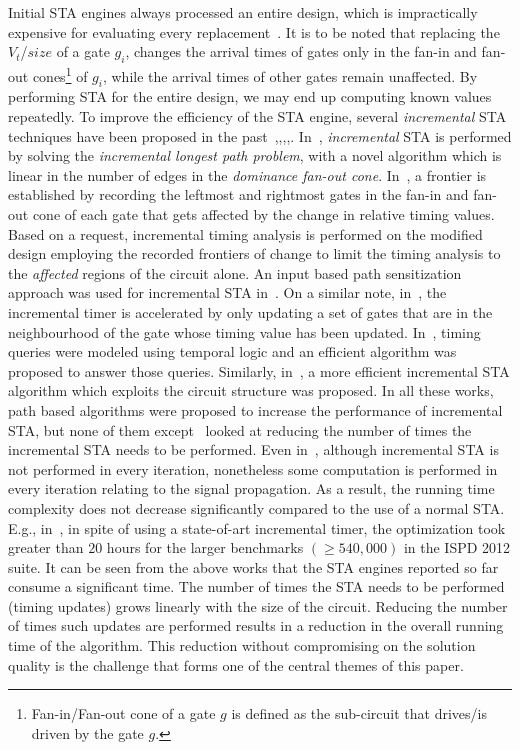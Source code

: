 Initial STA engines always processed an entire design, which is impractically expensive for evaluating every 
        replacement~\cite{papa:10}. It is to be noted that replacing the $V_t$/$size$ of a gate $g_i$, changes the arrival times of gates only in the fan-in and fan-out cones\footnote{Fan-in/Fan-out cone of a gate $g$ is defined as the sub-circuit that drives/is driven by the gate $g$\cite{abramovci}.} of $g_i$, while the arrival times of other gates remain unaffected. By performing STA for the entire design, we may end up computing known values repeatedly. 
        To improve the efficiency of the STA engine, several {\em incremental} STA techniques have been proposed in the past~\cite{lee:95},\cite{abato:96},\cite{sapatnekar:96},\cite{mondal:04},\cite{das:06}. In~\cite{lee:95}, {\em incremental} STA is performed by solving the {\em incremental longest path problem}, with a novel algorithm which is linear in the number of edges in the {\em dominance fan-out cone}. In~\cite{abato:96}, a frontier is established by recording the leftmost and rightmost gates in the fan-in and fan-out cone of each gate that gets affected by the change in relative timing values.
Based on a request, incremental timing analysis is performed on the modified design
employing the recorded frontiers of change to limit the timing analysis to 
the {\em affected} regions of the circuit alone. An input based path sensitization approach 
was used for incremental STA in~\cite{sapatnekar:96}.
On a similar note, in~\cite{coudert:97}, the incremental timer is accelerated by only updating a 
set of gates that are in the neighbourhood of the gate whose timing value has been updated. 
In~\cite{mondal:04}, timing queries were modeled using temporal logic and an efficient 
algorithm was proposed to answer those queries. Similarly, in~\cite{das:06}, a more 
efficient incremental STA algorithm which exploits the circuit structure was proposed. 
In all these works, path based algorithms were proposed to 
increase the performance of incremental STA, but none of them except~\cite{abato:96} looked 
at reducing the number of times the incremental STA needs to be performed. 
Even in~\cite{abato:96}, although incremental STA is not performed in every iteration, 
nonetheless some computation is performed in every iteration relating to the signal propagation. 
As a result, the running time complexity does not decrease significantly compared to the use of a normal STA. 
E.g., in~\cite{hu:12}, in spite of using a state-of-art incremental timer, the optimization 
        took greater than $20$ hours for the larger benchmarks $(\ge 540,000)$ in the ISPD 2012 suite. It can be seen from the above works that the STA engines reported so far consume a significant time. The number of times the STA needs to be performed (timing updates) grows linearly with the size of the circuit. Reducing the number of times such updates are performed results in a reduction in the overall running time of the algorithm. This reduction without compromising on the solution quality is the challenge that forms one of the central themes of this paper.



